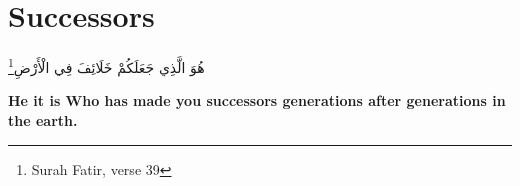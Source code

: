\chapter{Successors}
\begin{center}
    {\Huge    
        \begin{Arabic}
            هُوَ الَّذِي جَعَلَكُمْ خَلَائِفَ فِي الْأَرْضِ\footnote{Surah Fatir, verse 39}
        \end{Arabic}
    }    
\end{center}
\vspace*{\fill}
\vspace{3cm}
\begin{center}
    \Large \textbf{He it is Who has made you successors generations after generations in the earth.}
\end{center}
